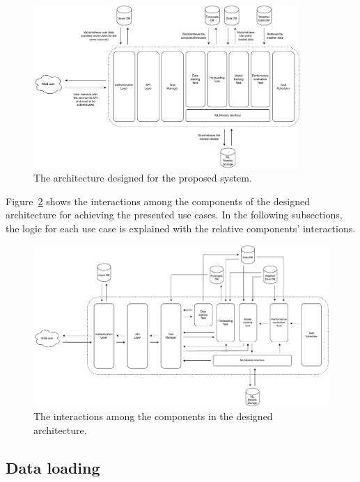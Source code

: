 \begin{figure}[H]
\centering
\includegraphics[width=0.9\textwidth]{images/architecture_components}
\caption{The architecture designed for the proposed system.}
\label{fig:components}
\end{figure}

Figure~\ref{fig:interactions} shows the interactions among the components of the designed architecture for achieving the presented use cases.
In the following subsections, the logic for each use case is explained with the relative components' interactions.

\begin{figure}[H]
\centering
\includegraphics[width=1\textwidth]{images/architecture_interactions}
\caption{The interactions among the components in the designed architecture.}
\label{fig:interactions}
\end{figure}


\vspace{0.1 cm}
\subsection{Data loading}
\label{sec:loading}
\vspace{0.1 cm}

